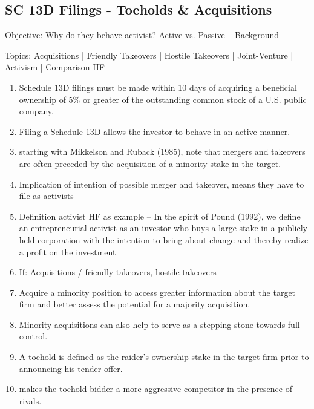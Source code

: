 \documentclass[12pt]{article}
\begin{document}
\subsection{SC 13D Filings - Toeholds \& Acquisitions} 
\begin{center}
Objective: Why do they behave activist? Active vs. Passive -- Background
\end{center}
Topics: Acquisitions | Friendly Takeovers | Hostile Takeovers | Joint-Venture | Activism | Comparison HF

    \begin{enumerate}
        \item Schedule 13D filings must be made within 10 days of acquiring a beneficial ownership of 5\% or greater of the outstanding common stock of a U.S. public company. \citep{Brigida2012}
        \item Filing a Schedule 13D allows the investor to behave in an active manner. \citep{Brigida2012}  
        \item starting with Mikkelson and Ruback (1985), note that mergers and takeovers are often preceded by the acquisition of a minority stake in the target. \citep{Greenwood2009}
        \item Implication of intention of possible merger and takeover, means they have to file as activists

        \item Definition activist HF as example -- In the spirit of Pound (1992), we define an entrepreneurial activist as an investor who buys a large stake in a publicly held corporation with the intention to bring about change and thereby realize a profit on the investment \citep{Klein2009}

        \item If: Acquisitions / friendly takeovers, hostile takeovers
        \item Acquire a minority position to access greater information about the target firm and better assess the potential for a majority acquisition. \citep{Ouimet2013}
        \item Minority acquisitions can also help to serve as a stepping-stone towards full control. \citep{huang}
        \item A toehold is defined as the raider’s ownership stake in the target firm prior to announcing his tender offer. \citep{Goldman2005}
        \item makes the toehold bidder a more aggressive competitor in the presence of rivals. \citep{Mitchell2011}
    \end{enumerate}
\end{document}
